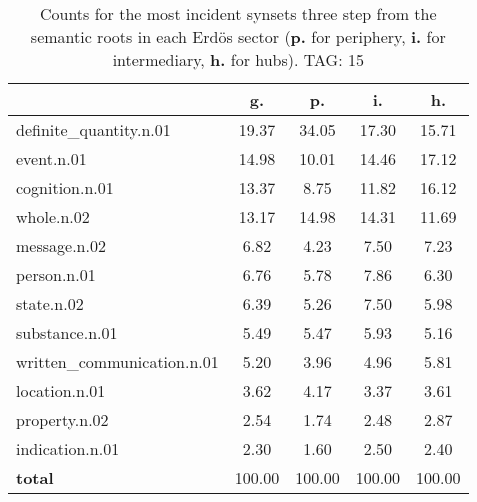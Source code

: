 \begin{table}[h!]
\begin{center}
\begin{tabular}{| l || c | c | c | c |}\hline
 & {\bf g.} & {\bf p.} & {\bf i.} & {\bf h.} \\\hline\hline
definite\_quantity.n.01 & 19.37  & 34.05  & 17.30  & 15.71 \\\hline
event.n.01 & 14.98  & 10.01  & 14.46  & 17.12 \\\hline
cognition.n.01 & 13.37  & 8.75  & 11.82  & 16.12 \\\hline
whole.n.02 & 13.17  & 14.98  & 14.31  & 11.69 \\\hline
message.n.02 & 6.82  & 4.23  & 7.50  & 7.23 \\\hline
person.n.01 & 6.76  & 5.78  & 7.86  & 6.30 \\\hline
state.n.02 & 6.39  & 5.26  & 7.50  & 5.98 \\\hline
substance.n.01 & 5.49  & 5.47  & 5.93  & 5.16 \\\hline
written\_communication.n.01 & 5.20  & 3.96  & 4.96  & 5.81 \\\hline
location.n.01 & 3.62  & 4.17  & 3.37  & 3.61 \\\hline
property.n.02 & 2.54  & 1.74  & 2.48  & 2.87 \\\hline
indication.n.01 & 2.30  & 1.60  & 2.50  & 2.40 \\\hline\hline
{{\bf total}} & 100.00  & 100.00  & 100.00  & 100.00 \\\hline
\end{tabular}
\caption{Counts for the most incident synsets three step from the semantic roots in each Erd\"os sector ({\bf p.} for periphery, {\bf i.} for intermediary, {\bf h.} for hubs). TAG: 15}
\end{center}
\end{table}